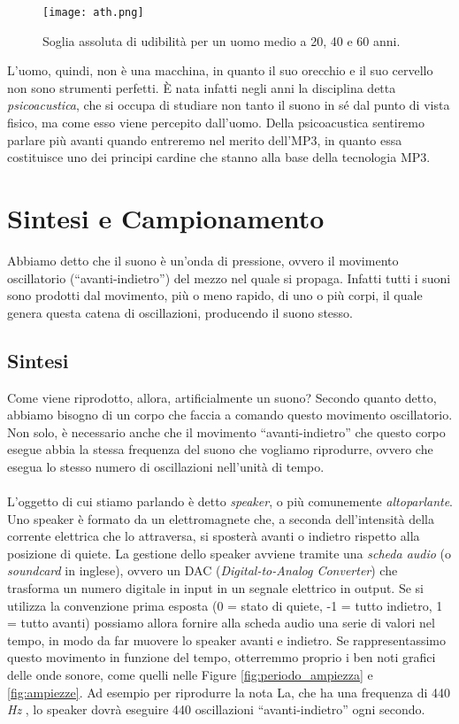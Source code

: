 		\begin{figure}[h!]
			\centering
				\texttt{[image: ath.png]}
			\caption[Soglia assoluta di udibilità.]{Soglia assoluta di udibilità per un uomo medio a 20, 40 e 60 anni.}
			\label{fig:ath}
		\end{figure}
		
		L'uomo, quindi, non è una macchina, in quanto il suo orecchio e il suo cervello non sono strumenti perfetti. È nata infatti negli anni la disciplina detta \textit{psicoacustica}, che si occupa di studiare non tanto il suono in sé dal punto di vista fisico, ma come esso viene percepito dall'uomo. Della psicoacustica sentiremo parlare più avanti quando entreremo nel merito dell'MP3, in quanto essa costituisce uno dei principi cardine che stanno alla base della tecnologia MP3.
		
	\section{Sintesi e Campionamento} \label{sec:campionamento_sintesi}
	
		Abbiamo detto che il suono è un'onda di pressione, ovvero il movimento oscillatorio (``avanti-indietro'') del mezzo nel quale si propaga. Infatti tutti i suoni sono prodotti dal movimento, più o meno rapido, di uno o più corpi, il quale genera questa catena di oscillazioni, producendo il suono stesso.
		
		\subsection{Sintesi} \label{subsec:sintesi}
		
			Come viene riprodotto, allora, artificialmente un suono? Secondo quanto detto, abbiamo bisogno di un corpo che faccia a comando questo movimento oscillatorio. Non solo, è necessario anche che il movimento ``avanti-indietro'' che questo corpo esegue abbia la stessa frequenza del suono che vogliamo riprodurre, ovvero che esegua lo stesso numero di oscillazioni nell'unità di tempo.\\
			\\
			L'oggetto di cui stiamo parlando è detto \textit{speaker}, o più comunemente \textit{altoparlante}. Uno speaker è formato da un elettromagnete che, a seconda dell'intensità della corrente elettrica che lo attraversa, si sposterà avanti o indietro rispetto alla posizione di quiete. La gestione dello speaker avviene tramite una \textit{scheda audio} (o \textit{soundcard} in inglese), ovvero un DAC (\textit{Digital-to-Analog Converter}) che trasforma un numero digitale in input in un segnale elettrico in output. Se si utilizza la convenzione prima esposta (0 = stato di quiete, -1 = tutto indietro, 1 = tutto avanti) possiamo allora fornire alla scheda audio una serie di valori nel tempo, in modo da far muovere lo speaker avanti e indietro. Se rappresentassimo questo movimento in funzione del tempo, otterremmo proprio i ben noti grafici delle onde sonore, come quelli nelle Figure \ref{fig:periodo_ampiezza} e \ref{fig:ampiezze}. Ad esempio per riprodurre la nota La, che ha una frequenza di 440 \textit{Hz} \cite{mtu}, lo speaker dovrà eseguire 440 oscillazioni ``avanti-indietro'' ogni secondo.
			
